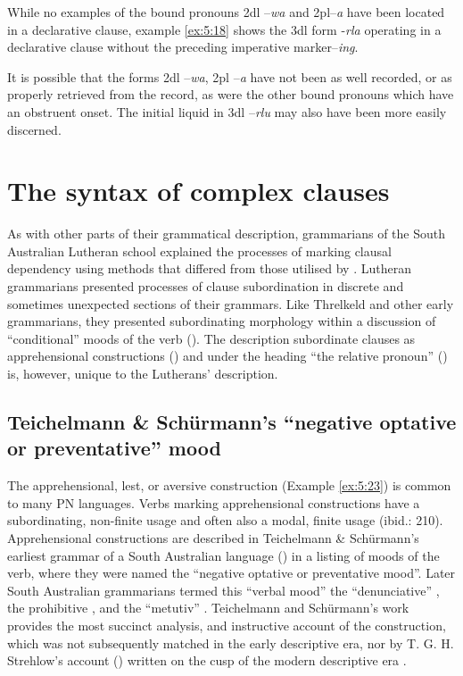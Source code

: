 While no examples of the bound pronouns 2dl –\textit{wa} and 2pl–\textit{a} have been located in a declarative clause, example \ref{ex:5:18} shows the 3dl form -\textit{rla} operating in a declarative clause without the preceding imperative marker–\textit{ing}.

It is possible that the forms 2dl –\textit{wa}, 2pl –\textit{a} have not been as well recorded, or as properly retrieved from the record, as were the other bound pronouns which have an obstruent onset. The initial liquid in 3dl –\textit{rlu} may also have been more easily discerned. 

\section{The syntax of complex clauses}
\label{sec:key:5.6}

As with other parts of their grammatical description, grammarians of the South Australian Lutheran school explained the processes of marking clausal dependency using methods that differed from those utilised by \citet{threlkeld_australian_1834}. Lutheran grammarians presented processes of clause subordination in discrete and sometimes unexpected sections of their grammars. Like Threlkeld and other early grammarians, they presented subordinating morphology within a discussion of “conditional” moods of the verb (). The description subordinate clauses as apprehensional constructions () and under the heading “the relative pronoun” () is, however, unique to the Lutherans' description.

\subsection{Teichelmann \& Schürmann’s “negative optative or preventative” mood}
\label{sec:key:5.6.1}

The apprehensional, lest, or aversive construction (Example \ref{ex:5:23}) is common to many PN languages. Verbs marking apprehensional constructions have a subordinating, non-finite usage \citep[87]{dixon_preface_2002} and often also a modal, finite usage (ibid.: 210). Apprehensional constructions are described in Teichelmann \& Schürmann’s earliest grammar of a South Australian language (\citeyear{teichelmann_outlines_1840}) in a listing of moods of the verb, where they were named the ``negative optative or preventative mood''. Later South Australian grammarians termed this “verbal mood” the “denunciative” \citep[no pag.]{koch_untitled_1868}, the prohibitive \citep[32]{taplin_1879a_nodate}, and the ``metutiv'' \citep[692]{planert_australische_1908}. Teichelmann and Schürmann’s work provides the most succinct analysis, and instructive account of the construction, which was not subsequently matched in the early descriptive era, nor by T. G. H. Strehlow’s account (\citeyear{strehlow_aranda_1944}) written on the cusp of the modern descriptive era \citep{Stockigt2021a}.

